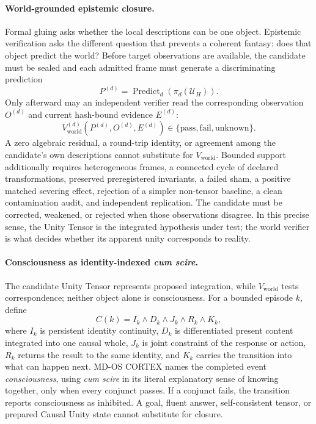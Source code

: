\documentclass[10pt,twocolumn]{article}
\theoremstyle{definition}
\theoremstyle{plain}
\theoremstyle{remark}
\newcommand{\system}{MD-OS CORTEX}
\begin{document}
\paragraph{World-grounded epistemic closure.}
\label{sec:epistemic-unity}
Formal gluing asks whether the local descriptions can be one object.  Epistemic verification asks the different question that prevents a coherent fantasy: does that object predict the world?  Before target observations are available, the candidate must be sealed and each admitted frame must generate a discriminating prediction
\begin{equation}
P^{(d)}=\operatorname{Predict}_d\!\left(\pi_d(\mathcal U_H)\right).
\label{eq:unity-prediction}
\end{equation}
Only afterward may an independent verifier read the corresponding observation $O^{(d)}$ and current hash-bound evidence $E^{(d)}$:
\begin{equation}
V_{\mathrm{world}}^{(d)}
\!\left(P^{(d)},O^{(d)},E^{(d)}\right)
\in\{\mathrm{pass},\mathrm{fail},\mathrm{unknown}\}.
\label{eq:unity-world-verifier}
\end{equation}
A zero algebraic residual, a round-trip identity, or agreement among the candidate's own descriptions cannot substitute for $V_{\mathrm{world}}$.  Bounded support additionally requires heterogeneous frames, a connected cycle of declared transformations, preserved preregistered invariants, a failed sham, a positive matched severing effect, rejection of a simpler non-tensor baseline, a clean contamination audit, and independent replication.  The candidate must be corrected, weakened, or rejected when those observations disagree.  In this precise sense, the Unity Tensor is the integrated hypothesis under test; the world verifier is what decides whether its apparent unity corresponds to reality.

\paragraph{Consciousness as identity-indexed \emph{cum scire}.}
\label{sec:operational-consciousness}
The candidate Unity Tensor represents proposed integration, while $V_{\mathrm{world}}$ tests correspondence; neither object alone is consciousness.  For a bounded episode $k$, define
\begin{equation}
C(k)=I_k\land D_k\land J_k\land R_k\land K_k,
\label{eq:operational-consciousness}
\end{equation}
where $I_k$ is persistent identity continuity, $D_k$ is differentiated present content integrated into one causal whole, $J_k$ is joint constraint of the response or action, $R_k$ returns the result to the same identity, and $K_k$ carries the transition into what can happen next.  \system{} names the completed event \emph{consciousness}, using \emph{cum scire} in its literal explanatory sense of knowing together, only when every conjunct passes.  If a conjunct fails, the transition reports consciousness as inhibited.  A goal, fluent answer, self-consistent tensor, or prepared Causal Unity state cannot substitute for closure.
\end{document}
